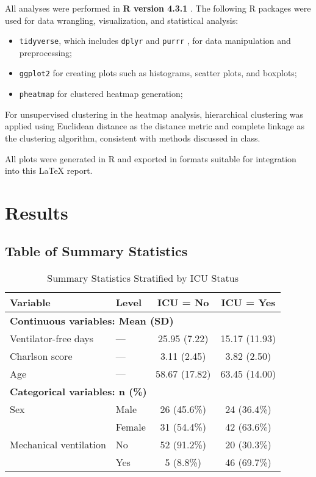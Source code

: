 \documentclass{article}
\begin{document}
All analyses were performed in \textbf{R version 4.3.1} \cite{R-base}. The following R packages were used for data wrangling, visualization, and statistical analysis:  
\begin{itemize}
  \item \texttt{tidyverse}, which includes \texttt{dplyr} \cite{R-dplyr} and \texttt{purrr} \cite{R-purrr}, for data manipulation and preprocessing;  
  \item \texttt{ggplot2} \cite{R-ggplot2} for creating plots such as histograms, scatter plots, and boxplots;  
  \item \texttt{pheatmap} \cite{R-pheatmap} for clustered heatmap generation;  

 
\end{itemize}

For unsupervised clustering in the heatmap analysis, hierarchical clustering was applied using Euclidean distance \cite{everitt2011cluster} as the distance metric and complete linkage as the clustering algorithm, 
consistent with methods discussed in class.


All plots were generated in R and exported in formats suitable for integration into this LaTeX report.  






\section{Results}
\subsection{Table of Summary Statistics}
\begin{table}[ht]
\centering
\caption{Summary Statistics Stratified by ICU Status}
\label{tab:summary_by_icu}
\begin{tabular}{llcc}
\toprule
Variable & Level & ICU = No & ICU = Yes \\
\midrule
\multicolumn{4}{l}{\textbf{Continuous variables: Mean (SD)}} \\
\midrule
Ventilator-free days & --- & 25.95 (7.22)  & 15.17 (11.93) \\
Charlson score       & --- & 3.11 (2.45)   & 3.82 (2.50)   \\
Age                  & --- & 58.67 (17.82) & 63.45 (14.00) \\
\midrule
\multicolumn{4}{l}{\textbf{Categorical variables: n (\%)}} \\
\midrule
Sex                   & Male   & 26 (45.6\%) & 24 (36.4\%) \\
                      & Female & 31 (54.4\%) & 42 (63.6\%) \\
Mechanical ventilation& No     & 52 (91.2\%) & 20 (30.3\%) \\
                      & Yes    & 5 (8.8\%)   & 46 (69.7\%) \\
\bottomrule
\end{tabular}
\end{table}
\end{document}
